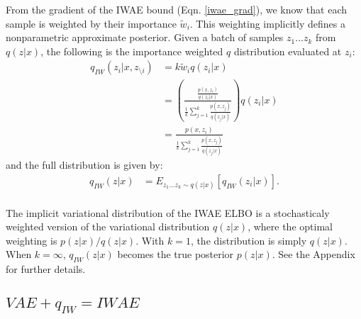\documentclass{article} %
\begin{document}
From the gradient of the IWAE bound (Eqn. \ref{iwae_grad}), we know that each sample is weighted by their importance $\tilde{w}_i$. This weighting implicitly defines a nonparametric approximate posterior. Given a batch of samples $z_{1}...z_{k}$ from $q(z|x)$, the following is the importance weighted $q$ distribution evaluated at $z_i$:
\begin{align} 
    q_{IW}(z_i|x,z_{\setminus i}) &= k \tilde{w}_i  q(z_i|x)\\
    &= \left( \frac{ \frac{p(x,z_i)}{q(z_i|x)}}{\frac{1}{k}   \sum_{j=1}^k \frac{p(x,z_j)}{q(z_j|x)} } \right) q(z_i|x) \\
    &=  \frac{p(x,z_i)}{\frac{1}{k}   \sum_{j=1}^k \frac{p(x,z_j)}{q(z_j|x)}} 
\end{align}
and the full distribution is given by:
\begin{align} 
    q_{IW}(z|x) &= E_{z_{1}...z_{k} \sim q(z|x)} \left[ q_{IW}(z_i|x) \right]. 
\end{align}\\
The implicit variational distribution of the IWAE ELBO is a stochasticaly weighted version of the variational distribution $q(z|x)$, where the optimal weighting is $p(z|x) / q(z|x)$. 
With $k=1$, the distribution is simply $q(z|x)$. When $k=\infty$, $q_{IW}(z|x)$ becomes the true posterior $p(z|x)$. See the Appendix for further details.


\subsection{$VAE+q_{IW} = IWAE$}
\end{document}
